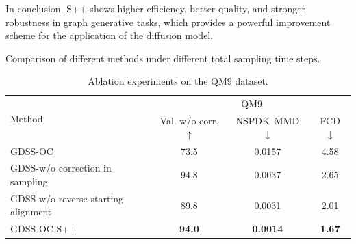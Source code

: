 \documentclass{article}
\begin{document}
In conclusion, S++ shows higher efficiency, better quality, and stronger robustness in graph generative tasks, which provides a powerful improvement scheme for the application of the diffusion model.
\begin{table}[!t]
\caption{Comparison of different methods under different total sampling time steps.}\label{tab:rapid sampling}\vspace{-3mm}
\centering
{}
\vspace{4mm}
\caption{Ablation experiments on the QM9 dataset.}\label{Ablation study}
\vspace{-3mm}
\begin{tabular}{@{}lccc@{}}
\toprule
\multirow{2}{*}{Method} & \multicolumn{3}{c}{QM9} \\
\cmidrule(lr){2-4} 
 & Val. w/o corr. $\uparrow$ & NSPDK~MMD $\downarrow$ & FCD $\downarrow$ \\
\midrule
GDSS-OC & 73.5 & 0.0157 & 4.58 \\
GDSS-w/o correction in sampling & 94.8 & 0.0037 & 2.65 \\
GDSS-w/o reverse-starting alignment & 89.8 & 0.0031 & 2.01 \\
GDSS-OC-S++ & \textbf{94.0} & \textbf{0.0014} & \textbf{1.67} \\
\bottomrule
\end{tabular}%
\end{table}
\end{document}

